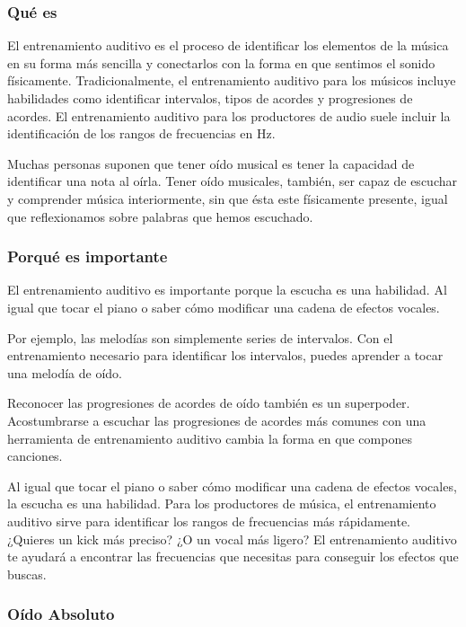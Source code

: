\documentclass[12pt,twoside,titlepage]{report}
\begin{document}
\subsubsection{Qué es}

El entrenamiento auditivo es el proceso de identificar los elementos de la música en su forma más sencilla y conectarlos con la forma en que sentimos el sonido físicamente. Tradicionalmente, el entrenamiento auditivo para los músicos incluye habilidades como identificar intervalos, tipos de acordes y progresiones de acordes. El entrenamiento auditivo para los productores de audio suele incluir la identificación de los rangos de frecuencias en Hz.

Muchas personas suponen que tener oído musical es tener la capacidad de identificar una nota al oírla. Tener oído musicales, también, ser capaz de escuchar y comprender música interiormente, sin que ésta este físicamente presente, igual que reflexionamos sobre palabras que hemos escuchado.

\subsubsection{Porqué es importante}

El entrenamiento auditivo es importante porque la escucha es una habilidad. Al igual que tocar el piano o saber cómo modificar una cadena de efectos vocales.

Por ejemplo, las melodías son simplemente series de intervalos. Con el entrenamiento necesario para identificar los intervalos, puedes aprender a tocar una melodía de oído.

Reconocer las progresiones de acordes de oído también es un superpoder. Acostumbrarse a escuchar las progresiones de acordes más comunes con una herramienta de entrenamiento auditivo cambia la forma en que compones canciones.

Al igual que tocar el piano o saber cómo modificar una cadena de efectos vocales, la escucha es una habilidad.
Para los productores de música, el entrenamiento auditivo sirve para identificar los rangos de frecuencias más rápidamente. ¿Quieres un kick más preciso? ¿O un vocal más ligero? El entrenamiento auditivo te ayudará a encontrar las frecuencias que necesitas para conseguir los efectos que buscas.

\subsubsection{Oído Absoluto}
\end{document}
